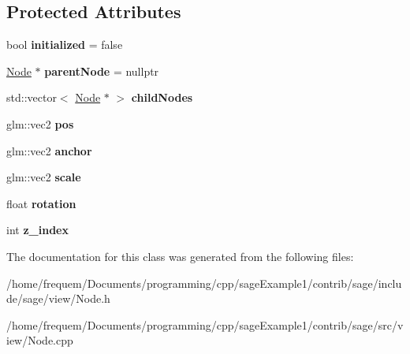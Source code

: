 \subsection*{Protected Attributes}
\begin{DoxyCompactItemize}
\item 
\mbox{\label{classsage_1_1Node_a2c2cf2d54ee6a9368ece7ea46ad13deb}} 
bool {\bfseries initialized} = false
\item 
\mbox{\label{classsage_1_1Node_a9f6d79896df762b8e8cff9574f1e9262}} 
\mbox{\hyperlink{classsage_1_1Node}{Node}} $\ast$ {\bfseries parent\+Node} = nullptr
\item 
\mbox{\label{classsage_1_1Node_a296882fbf277d09cb672da2275aa5527}} 
std\+::vector$<$ \mbox{\hyperlink{classsage_1_1Node}{Node}} $\ast$ $>$ {\bfseries child\+Nodes}
\item 
\mbox{\label{classsage_1_1Node_a7e0ae6eeb84fae60e54e6685c982b0b2}} 
glm\+::vec2 {\bfseries pos}
\item 
\mbox{\label{classsage_1_1Node_a0956f07efec6dcbd3cf796a9028b9175}} 
glm\+::vec2 {\bfseries anchor}
\item 
\mbox{\label{classsage_1_1Node_a3014b585d97d3a449e83bc0252db0c50}} 
glm\+::vec2 {\bfseries scale}
\item 
\mbox{\label{classsage_1_1Node_ae83b239ad4c722fee62708977e0560f4}} 
float {\bfseries rotation}
\item 
\mbox{\label{classsage_1_1Node_ad98383ce93e985bf20e1cd678c622097}} 
int {\bfseries z\+\_\+index}
\end{DoxyCompactItemize}


The documentation for this class was generated from the following files\+:\begin{DoxyCompactItemize}
\item 
/home/frequem/\+Documents/programming/cpp/sage\+Example1/contrib/sage/include/sage/view/Node.\+h\item 
/home/frequem/\+Documents/programming/cpp/sage\+Example1/contrib/sage/src/view/Node.\+cpp\end{DoxyCompactItemize}
